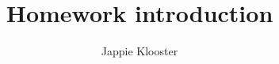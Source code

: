 \documentclass{article}
\begin{document}
\author{Jappie Klooster}
\title{Homework introduction}

\maketitle
\end{document}
